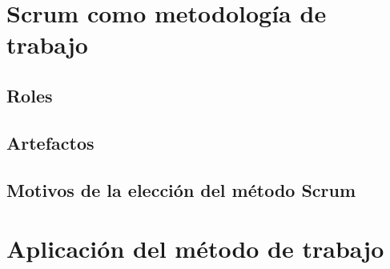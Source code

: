 \section{Scrum como metodología de trabajo}



\subsection{Roles}



\subsection{Artefactos}



\subsection{Motivos de la elección del método Scrum}



\section{Aplicación del método de trabajo}
